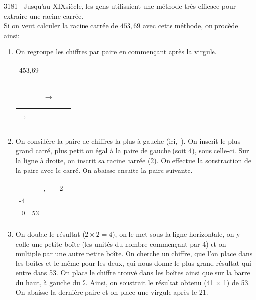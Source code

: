 \documentclass[letterpaper, 12pt]{article}
\begin{document}
3181-- Jusqu'au {\scriptsize XIX\ieme{}}si\`ecle, les gens utilisaient une m\'ethode tr\`es efficace pour extraire une racine carr\'ee.\\
Si on veut calculer la racine carr\'ee de $453,69$ avec cette m\'ethode, on proc\`ede ainsi:\\
\begin{enumerate}
\item On regroupe les chiffres par paire en commen\c cant apr\`es la virgule.\\
\begin{center}
\begin{tabular}{r|l}
453,69 & \ \ \ \ \ \ \ \ \ \ \\ \cline{2-2}
& \\
& \\
& \\
\end{tabular} \ \ \ \ \ \ \ \ $\longrightarrow$ \ \ \ \ \ \ \ \
\begin{tabular}{r|l}
\framebox[0.6cm]{4}\, \framebox[0.6cm]{53}\,, \framebox[0.6cm]{69} & \ \ \ \ \ \ \ \ \ \ \\ \cline{2-2}
& \\
& \\
& \\
\end{tabular}
\end{center}
\item On consid\`ere la paire de chiffres la plus \`a gauche (ici, \,). On inscrit le plus grand carr\'e, plus petit ou \'egal \`a la paire de gauche (soit 4), sous celle-ci.  Sur la ligne \`a droite, on inscrit sa racine carr\'ee (2). On effectue la soustraction de la paire avec le carr\'e. On abaisse ensuite la paire suivante.\\
\begin{center}
\begin{tabular}{r r l|l}
\framebox[0.6cm][r]{4} & \framebox[0.6cm]{53}\,, & \framebox[0.6cm]{69} & 2 \ \ \ \ \ \ \ \ \ \\ \cline{4-4}
-4 & & & \\ \cline{1-2}
0 & 53 \ \, & & \\
& & & \\
\end{tabular}
\end{center}
\item On double le r\'esultat ($2 \times 2 = 4$), on le met sous la ligne horizontale, on y colle une petite bo\^ite (les unit\'es du nombre commen\c cant par 4) et on multiple par une autre petite bo\^ite. On cherche un chiffre, que l'on place dans les bo\^ites et le m\^eme pour les deux, qui nous donne le plus grand r\'esultat qui entre dans 53. On place le chiffre trouv\'e dans les bo\^ites ainsi que sur la barre du haut, \`a gauche du 2. Ainsi, on soustrait le r\'esultat obtenu (41 $\times$ 1) de 53. On abaisse la derni\`ere paire et on place une virgule apr\`es le 21.\\

\end{enumerate}
\end{document}
